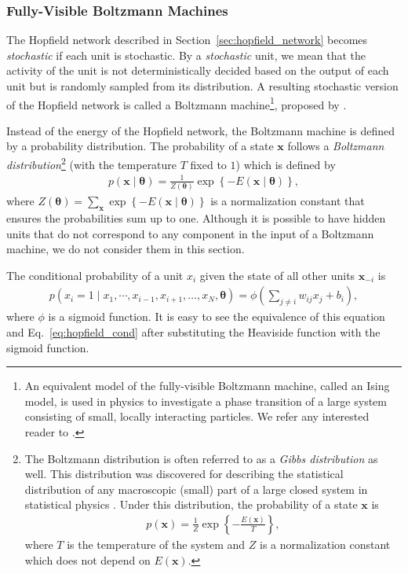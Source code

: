 \documentclass[dissertation,nocontribution,draft*]{aaltoseries}
\newcommand{\vect}[1]{\mathbf{#1}}
\newcommand{\vects}[1]{\boldsymbol{#1}}
\newcommand{\vx}[0]{\vect{x}}
\newcommand{\TT}[0]{{\vects{\theta}}}
\begin{document}
\subsubsection{Fully-Visible Boltzmann Machines}
\label{sec:fvbm}

The Hopfield network described in
Section~\ref{sec:hopfield_network} becomes
\textit{stochastic} if each unit is stochastic.
By a \textit{stochastic} unit, we mean that the activity of
the unit is not deterministically decided based on the
output of each unit but is randomly sampled from its
distribution.  A resulting stochastic version of the Hopfield
network is called a Boltzmann machine\footnote{ An
equivalent model of the fully-visible Boltzmann machine,
called an Ising model, is used in physics to investigate a
phase transition of a large system consisting of small,
locally interacting particles. We refer any interested
reader to \citep[][and references therein]{Cipra1987}.},
proposed by \citet{Ackley1985}. 

Instead of the energy of the Hopfield network, the Boltzmann
machine is defined by a probability distribution. The
probability of a state $\vx$ follows a \textit{Boltzmann
distribution}\footnote{The Boltzmann distribution is often
referred to as a \textit{Gibbs distribution} as well. This
distribution was discovered for describing the statistical
distribution of any macroscopic (small) part of a large
closed system in statistical physics \citep[see,
e.g.,][]{Landau1980}. Under this distribution, the
probability of a state $\vx$ is
\begin{align*}
    p(\vx) = \frac{1}{Z} \exp\left\{ -\frac{E(\vx)}{T}
    \right\},
\end{align*}
where $T$ is the temperature of the system and $Z$ is a
normalization constant which does not depend on $E(\vx)$.
}
(with the temperature $T$ fixed to $1$) which is
defined by
\begin{align}
    \label{eq:bm}
    p(\vx \mid \TT) = \frac{1}{Z(\TT)} \exp \left\{
    -E\left(\vx \mid \TT \right)\right\},
\end{align}
where $Z(\TT)=\sum_{\vx} \exp\left\{ -E(\vx \mid \TT)
\right\}$ is a normalization constant that ensures the
probabilities sum up to one. Although it is possible to have
hidden units that do not correspond to any component in the
input of a Boltzmann machine, we do not consider them in this
section.

The conditional probability of a unit $x_i$ given the state
of all other units $\vx_{-i}$ is
\begin{align}
    \label{eq:bm_cond}
    p(x_i = 1 \mid x_1, \cdots, x_{i-1}, x_{i+1}, \dots ,x_N,
    \TT) = \phi\left( \sum_{j \neq i} w_{ij} x_j + b_i
    \right),
\end{align}
where $\phi$ is a sigmoid function. It is easy to see the
equivalence of this equation and
Eq.~\eqref{eq:hopfield_cond} after substituting the
Heaviside function with the sigmoid function. 
\end{document}

